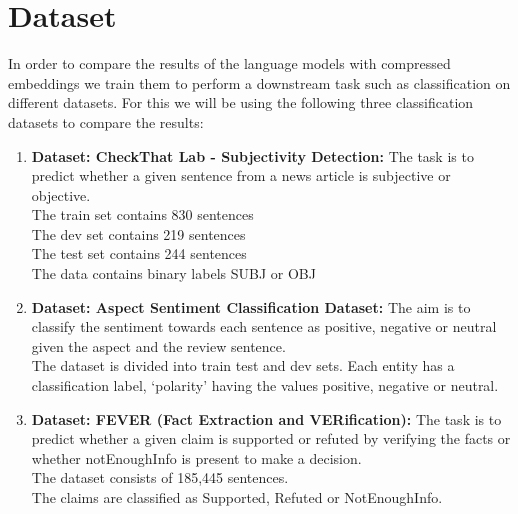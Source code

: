 \documentclass{article}
\begin{document}
\section{Dataset}
In order to compare the results of the language models with compressed embeddings we train them to perform a downstream task such as classification on different datasets. For this we will be using the following three classification datasets to compare the results:
\begin{enumerate}
    \item \textbf{Dataset: CheckThat Lab - Subjectivity Detection:}
    The task is to predict whether a given sentence from a news article is subjective or objective.\\
    The train set contains 830 sentences\\
    The dev set contains 219 sentences\\
    The test set contains 244 sentences\\
    The data contains binary labels SUBJ or OBJ

    \item \textbf{Dataset: Aspect Sentiment Classification Dataset:}
    The aim is to classify the sentiment towards each sentence as positive, negative or neutral given the aspect and the review sentence.\\
    The dataset is divided into train test and dev sets. Each entity has a classification label, ‘polarity’ having the values positive, negative or neutral.

    \item \textbf{Dataset: FEVER (Fact Extraction and VERification):}
    The task is to predict whether a given claim is supported or refuted by verifying the facts or whether notEnoughInfo is present to make a decision. \\
The dataset consists of 185,445 sentences.\\
The claims are classified as Supported, Refuted or NotEnoughInfo. 

\end{enumerate}
\end{document}
